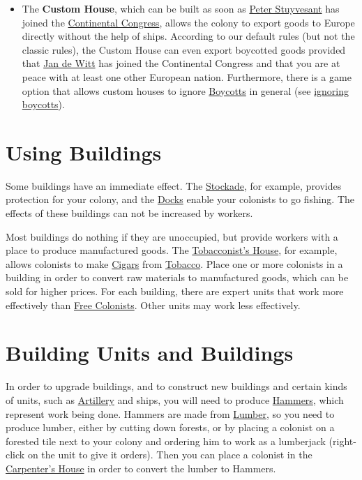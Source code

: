 \documentclass[12pt]{book}
\newcommand{\Building}[1]{\index{#1}\index{Buildings!#1}\hypertarget{#1}{\textbf{#1}}}
\begin{document}
\begin{itemize}
\item The \Building{Custom House}, which can be built as soon as
  \hyperlink{Peter Stuyvesant}{Peter Stuyvesant} has joined the
  \hyperlink{Continental Congress}{Continental Congress}, allows the
  colony to export goods to Europe directly without the help of
  ships. According to our default rules (but not the classic rules),
  the Custom House can even export boycotted goods provided that
  \hyperlink{Jan de Witt}{Jan de Witt} has joined the Continental
  Congress and that you are at peace with at least one other European
  nation. Furthermore, there is a game option that allows custom
  houses to ignore \hyperlink{Boycotts}{Boycotts} in general (see
  \hyperlink{ignore boycotts}{ignoring boycotts}).

\end{itemize}


\hypertarget{Using Buildings}{\section{Using Buildings}}

Some buildings have an immediate effect. The
\hyperlink{Stockade}{Stockade}, for example, provides protection for
your colony, and the \hyperlink{Dock}{Docks} enable your colonists to
go fishing. The effects of these buildings can not be increased by
workers.

Most buildings do nothing if they are unoccupied, but provide workers
with a place to produce manufactured goods. The
\hyperlink{Tobacconist's House}{Tobacconist's House}, for example,
allows colonists to make \hyperlink{Cigars}{Cigars} from
\hyperlink{Tobacco}{Tobacco}. Place one or more colonists in a
building in order to convert raw materials to manufactured goods,
which can be sold for higher prices. For each building, there are
expert units that work more effectively than \hyperlink{Free
  Colonist}{Free Colonists}. Other units may work less effectively.


\hypertarget{Building Units and Buildings}{\section{Building Units
and Buildings}}

In order to upgrade buildings, and to construct new buildings and
certain kinds of units, such as \hyperlink{Artillery}{Artillery} and
ships, you will need to produce \hyperlink{Hammers}{Hammers}, which
represent work being done. Hammers are made from
\hyperlink{Lumber}{Lumber}, so you need to produce lumber, either by
cutting down forests, or by placing a colonist on a forested tile next
to your colony and ordering him to work as a lumberjack (right-click
on the unit to give it orders). Then you can place a colonist in the
\hyperlink{Carpenter's House}{Carpenter's House} in order to convert
the lumber to Hammers.
\end{document}
